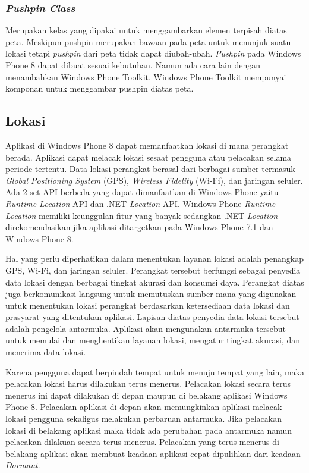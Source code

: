 \subsubsection{\textit{Pushpin Class}}
\label{subsubsec:Pushpin Class}
\hspace{0.5cm} Merupakan kelas yang dipakai untuk menggambarkan elemen terpisah diatas peta. Meskipun pushpin merupakan bawaan pada peta untuk menunjuk suatu lokasi tetapi \textit{pushpin} dari peta tidak dapat diubah-ubah. \textit{Pushpin} pada Windows Phone 8 dapat dibuat sesuai kebutuhan. Namun ada cara lain dengan menambahkan Windows Phone Toolkit. Windows Phone Toolkit mempunyai komponan untuk menggambar pushpin diatas peta.  

\subsection{Lokasi}
\label{subsec:Lokasi}
\hspace{0.5cm} Aplikasi di Windows Phone 8 dapat memanfaatkan lokasi di mana perangkat berada. Aplikasi dapat melacak lokasi sesaat  pengguna atau pelacakan selama periode tertentu. Data lokasi perangkat berasal dari berbagai sumber termasuk \textit{Global Positioning System} (GPS), \textit{Wireless Fidelity} (Wi-Fi), dan jaringan seluler. Ada 2 set API berbeda yang dapat dimanfaatkan di Windows Phone yaitu \textit{Runtime Location} API dan .NET \textit{Location} API. Windows Phone \textit{Runtime Location} memiliki keunggulan fitur yang banyak sedangkan .NET \textit{Location} direkomendasikan jika aplikasi ditargetkan pada Windows Phone 7.1 dan Windows Phone 8\cite{MSDN}.

Hal yang perlu diperhatikan dalam menentukan layanan lokasi adalah penangkap GPS, Wi-Fi, dan jaringan seluler. Perangkat tersebut berfungsi sebagai penyedia data lokasi dengan berbagai tingkat akurasi dan konsumsi daya. Perangkat diatas juga berkomunikasi langsung untuk memutuskan sumber mana yang digunakan untuk menentukan lokasi perangkat berdasarkan ketersediaan data lokasi dan prasyarat yang ditentukan aplikasi. Lapisan diatas penyedia data lokasi tersebut adalah pengelola antarmuka. Aplikasi akan mengunakan antarmuka tersebut untuk memulai dan menghentikan layanan lokasi, mengatur tingkat akurasi, dan menerima data lokasi.

Karena pengguna dapat berpindah tempat untuk menuju tempat yang lain, maka pelacakan lokasi harus dilakukan terus menerus. Pelacakan lokasi secara terus menerus ini dapat dilakukan di depan maupun di belakang aplikasi Windows Phone 8. Pelacakan aplikasi di depan akan memungkinkan aplikasi melacak lokasi pengguna sekaligus melakukan perbaruan antarmuka. Jika pelacakan lokasi di belakang aplikasi maka tidak ada perubahan pada antarmuka namun pelacakan dilakuan secara terus menerus. Pelacakan yang terus menerus di belakang aplikasi akan membuat keadaan aplikasi cepat dipulihkan dari keadaan \textit{Dormant}.

